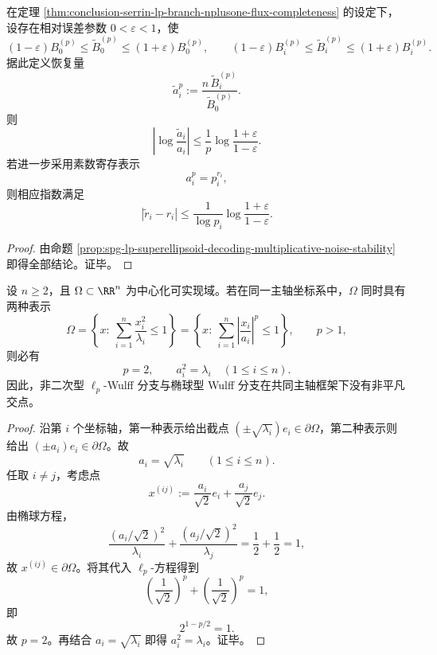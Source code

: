\begin{proposition}\label{prop:conclusion-serrin-lp-flux-log-stability-prime-ledger}
在定理 \ref{thm:conclusion-serrin-lp-branch-nplusone-flux-completeness} 的设定下，设存在相对误差参数 \(0<\varepsilon<1\)，使
\[
(1-\varepsilon)B_0^{(p)}\le \widetilde B_0^{(p)}\le (1+\varepsilon)B_0^{(p)},
\qquad
(1-\varepsilon)B_i^{(p)}\le \widetilde B_i^{(p)}\le (1+\varepsilon)B_i^{(p)}.
\]
据此定义恢复量
\[
\widetilde a_i^p:=\frac{n\,\widetilde B_i^{(p)}}{\widetilde B_0^{(p)}}.
\]
则
\[
\left|\log\frac{\widetilde a_i}{a_i}\right|
\le
\frac1p\log\frac{1+\varepsilon}{1-\varepsilon}.
\]
若进一步采用素数寄存表示
\[
a_i^p=p_i^{r_i},
\]
则相应指数满足
\[
|\widetilde r_i-r_i|
\le
\frac{1}{\log p_i}\log\frac{1+\varepsilon}{1-\varepsilon}.
\]
\end{proposition}
\begin{proof}
由命题 \ref{prop:spg-lp-superellipsoid-decoding-multiplicative-noise-stability} 即得全部结论。证毕。
\end{proof}

\begin{proposition}\label{prop:conclusion-serrin-ellipsoid-lp-transverse-rigidity}
设 \(n\ge 2\)，且 \(\Omega\subset\RR^n\) 为中心化可实现域。若在同一主轴坐标系中，\(\Omega\) 同时具有两种表示
\[
\Omega=
\left\{
x:\ \sum_{i=1}^n\frac{x_i^2}{\lambda_i}\le 1
\right\}
=
\left\{
x:\ \sum_{i=1}^n\left|\frac{x_i}{a_i}\right|^p\le 1
\right\},
\qquad
p>1,
\]
则必有
\[
p=2,
\qquad
a_i^2=\lambda_i\quad(1\le i\le n).
\]
因此，非二次型 \(\ell_p\)-Wulff 分支与椭球型 Wulff 分支在共同主轴框架下没有非平凡交点。
\end{proposition}
\begin{proof}
沿第 \(i\) 个坐标轴，第一种表示给出截点 \((\pm\sqrt{\lambda_i})e_i\in\partial\Omega\)，第二种表示则给出 \((\pm a_i)e_i\in\partial\Omega\)。故
\[
a_i=\sqrt{\lambda_i}\qquad(1\le i\le n).
\]
任取 \(i\neq j\)，考虑点
\[
x^{(ij)}:=\frac{a_i}{\sqrt2}e_i+\frac{a_j}{\sqrt2}e_j.
\]
由椭球方程，
\[
\frac{(a_i/\sqrt2)^2}{\lambda_i}
+
\frac{(a_j/\sqrt2)^2}{\lambda_j}
=
\frac12+\frac12=1,
\]
故 \(x^{(ij)}\in\partial\Omega\)。将其代入 \(\ell_p\)-方程得到
\[
\left(\frac1{\sqrt2}\right)^p+\left(\frac1{\sqrt2}\right)^p=1,
\]
即
\[
2^{1-p/2}=1.
\]
故 \(p=2\)。再结合 \(a_i=\sqrt{\lambda_i}\) 即得 \(a_i^2=\lambda_i\)。证毕。
\end{proof}


